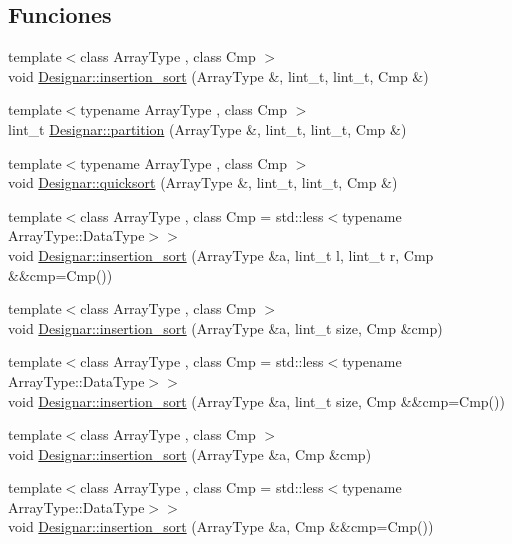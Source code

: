 \subsection*{Funciones}
\begin{DoxyCompactItemize}
\item 
{\footnotesize template$<$class Array\+Type , class Cmp $>$ }\\void \hyperlink{namespace_designar_a9fec85a7dda46bb4840bf066c8483853}{Designar\+::insertion\+\_\+sort} (Array\+Type \&, lint\+\_\+t, lint\+\_\+t, Cmp \&)
\item 
{\footnotesize template$<$typename Array\+Type , class Cmp $>$ }\\lint\+\_\+t \hyperlink{namespace_designar_a43b31dd9df26bd0c268d2aa653de6cf0}{Designar\+::partition} (Array\+Type \&, lint\+\_\+t, lint\+\_\+t, Cmp \&)
\item 
{\footnotesize template$<$typename Array\+Type , class Cmp $>$ }\\void \hyperlink{namespace_designar_a2e26fd2dcbb26e5ffc96a960dd4caa94}{Designar\+::quicksort} (Array\+Type \&, lint\+\_\+t, lint\+\_\+t, Cmp \&)
\item 
{\footnotesize template$<$class Array\+Type , class Cmp  = std\+::less$<$typename Array\+Type\+::\+Data\+Type$>$$>$ }\\void \hyperlink{namespace_designar_ab2f897d6db2113316fee5efcd50a459d}{Designar\+::insertion\+\_\+sort} (Array\+Type \&a, lint\+\_\+t l, lint\+\_\+t r, Cmp \&\&cmp=Cmp())
\item 
{\footnotesize template$<$class Array\+Type , class Cmp $>$ }\\void \hyperlink{namespace_designar_a54b704ec22eb8fe7136b1bda64daf3a7}{Designar\+::insertion\+\_\+sort} (Array\+Type \&a, lint\+\_\+t size, Cmp \&cmp)
\item 
{\footnotesize template$<$class Array\+Type , class Cmp  = std\+::less$<$typename Array\+Type\+::\+Data\+Type$>$$>$ }\\void \hyperlink{namespace_designar_a8655d6fa8772dee92565bf7475e5612d}{Designar\+::insertion\+\_\+sort} (Array\+Type \&a, lint\+\_\+t size, Cmp \&\&cmp=Cmp())
\item 
{\footnotesize template$<$class Array\+Type , class Cmp $>$ }\\void \hyperlink{namespace_designar_ab78e23e3c8eb0365e27244f5de2532d2}{Designar\+::insertion\+\_\+sort} (Array\+Type \&a, Cmp \&cmp)
\item 
{\footnotesize template$<$class Array\+Type , class Cmp  = std\+::less$<$typename Array\+Type\+::\+Data\+Type$>$$>$ }\\void \hyperlink{namespace_designar_a93966614af4a5a6c0bd78fe75af5e7cf}{Designar\+::insertion\+\_\+sort} (Array\+Type \&a, Cmp \&\&cmp=Cmp())

\end{DoxyCompactItemize}
